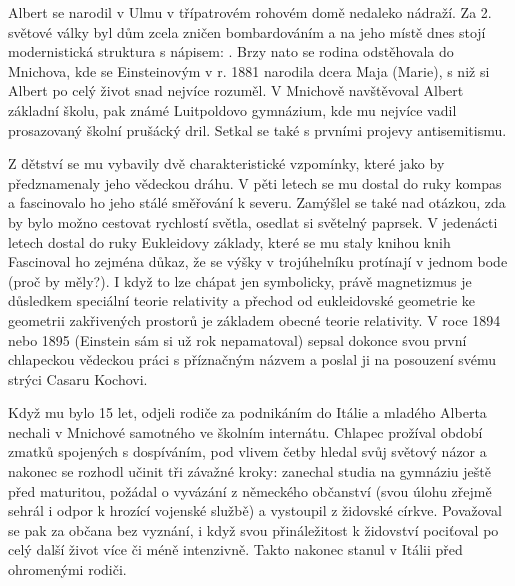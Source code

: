         Albert se narodil v Ulmu v třípatrovém rohovém domě nedaleko nádraží. Za 2. světové války
        byl dům zcela zničen bombardováním a na jeho místě dnes stojí modernistická struktura s
        nápisem: \emph{}.
        Brzy nato se rodina odstěhovala do Mnichova, kde se Einsteinovým v r. 1881 narodila dcera
        Maja (Marie), s niž si Albert po celý život snad nejvíce rozuměl. V Mnichově navštěvoval
        Albert základní školu, pak známé Luitpoldovo gymnázium, kde mu nejvíce vadil prosazovaný
        školní prušácký dril. Setkal se také s prvními projevy antisemitismu.

        Z dětství se mu vybavily dvě charakteristické vzpomínky, které jako by předznamenaly jeho
        vědeckou dráhu. V pěti letech se mu dostal do ruky kompas a fascinovalo ho jeho stálé
        směřování k severu. Zamýšlel se také nad otázkou, zda by bylo možno cestovat rychlostí
        světla, osedlat si světelný paprsek. V jedenácti letech dostal do ruky Eukleidovy základy,
        které se mu staly knihou knih Fascinoval ho zejména důkaz, že se výšky v trojúhelníku
        protínají v jednom bode (proč by měly?). I když to lze chápat jen symbolicky, právě
        magnetizmus je důsledkem speciální teorie relativity a přechod od eukleidovské geometrie ke
        geometrii zakřivených prostorů je základem obecné teorie relativity. V roce 1894 nebo 1895
        (Einstein sám si už rok nepamatoval) sepsal dokonce svou první chlapeckou vědeckou práci s
        příznačným názvem \emph{} a poslal ji na
        posouzení svému strýci Casaru Kochovi.

        Když mu bylo 15 let, odjeli rodiče za podnikáním do Itálie a mladého Alberta nechali v
        Mnichové samotného ve školním internátu. Chlapec prožíval období zmatků spojených s
        dospíváním, pod vlivem četby hledal svůj světový názor a nakonec se rozhodl učinit tři
        závažné kroky: zanechal studia na gymnáziu ještě před maturitou, požádal o vyvázání z
        německého občanství (svou úlohu zřejmě sehrál i odpor k hrozící vojenské službě) a vystoupil
        z židovské církve. Považoval se pak za občana bez vyznání, i když svou přináležitost k
        židovství pociťoval po celý další život více či méně intenzivně. Takto nakonec stanul v
        Itálii před ohromenými rodiči.


